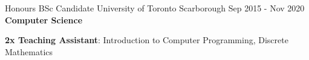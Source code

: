 
\begin{cventries}
  \cventry
    {Honours BSc Candidate}
    {University of Toronto}
    {Scarborough}
    {Sep 2015 - Nov 2020}
    {\textbf{Computer Science}}
    {
      \begin{cvitems}
        \item {\textbf{2x Teaching Assistant}: Introduction to Computer Programming, Discrete Mathematics}
      \end{cvitems}
    }
\end{cventries}
